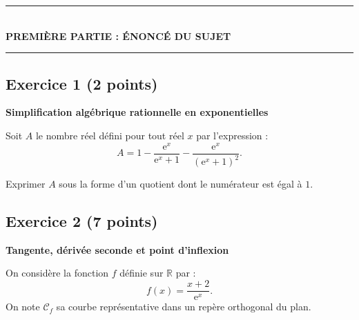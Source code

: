 \documentclass[11pt,a4paper]{article}
\newcommand{\R}{\mathbb{R}}
\newcommand{\e}{\mathrm{e}}
\begin{document}
\vspace{0.4cm}

\begin{center}
    \rule{0.35\textwidth}{0.8pt}\\[0.15cm]
    {\Large \bfseries PREMIÈRE PARTIE : ÉNONCÉ DU SUJET}\\[0.1cm]
    \rule{0.35\textwidth}{0.8pt}
\end{center}

\vspace{0.2cm}

\subsection*{Exercice 1 \hfill \normalfont\normalsize (2 points)}
\textbf{Simplification algébrique rationnelle en exponentielles}

\medskip
Soit $A$ le nombre réel défini pour tout réel $x$ par l'expression :
\[
A = 1 - \frac{\e^x}{\e^x + 1} - \frac{\e^x}{(\e^x + 1)^2}.
\]

Exprimer $A$ sous la forme d'un quotient dont le numérateur est égal à $1$.

\vspace{0.5cm}

\subsection*{Exercice 2 \hfill \normalfont\normalsize (7 points)}
\textbf{Tangente, dérivée seconde et point d'inflexion}

\medskip
On considère la fonction $f$ définie sur $\R$ par :
\[
f(x) = \frac{x+2}{\e^x}.
\]
On note $\mathcal{C}_f$ sa courbe représentative dans un repère orthogonal du plan.
\end{document}
